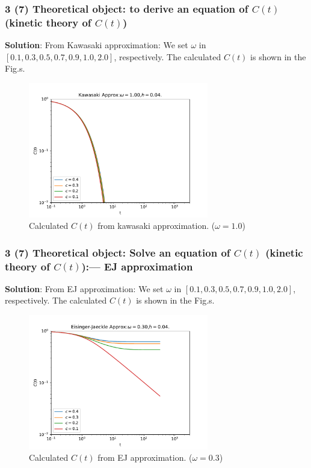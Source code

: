 \documentclass[8pt]{beamer}
\begin{document}
\begin{frame}
	\frametitle{3 (7) Theoretical object: to derive an equation of $C(t)$ (kinetic theory of $C(t)$)}
	
	{\textbf{Solution}}: From
	Kawasaki approximation:
	We set $\omega$ in  $[0.1,0.3,0.5,0.7,0.9,1.0,2.0]$, respectively.  The calculated $C(t)$ is shown in the Fig.s.
	\begin{figure}
		\centering
		\includegraphics [width=0.7\textwidth] {../../kawasaki_approx/imag/beta_dependence_of_corr_omega1.00_step13_h0.04_loglog.pdf}
		\setlength{\abovecaptionskip}{0pt}
		\caption{Calculated $C(t)$ from kawasaki approximation. ($\omega = 1.0$) }
	\end{figure}
\end{frame}

\begin{frame}
	\frametitle{3 (7) Theoretical object: Solve an equation of $C(t)$ (kinetic theory of $C(t)$):--- EJ approximation}	
	{\textbf{Solution}}: From
	EJ approximation:
	We set $\omega$ in  $[0.1,0.3,0.5,0.7,0.9,1.0,2.0]$, respectively.  The calculated $C(t)$ is shown in the Fig.s.
	\begin{figure}
		\centering
		\includegraphics [width=0.7\textwidth] {../../EJ_approx/imag/beta_dependence_of_corr_omega0.30_step13_h0.04_loglog.pdf}
		\setlength{\abovecaptionskip}{0pt}
		\caption{Calculated $C(t)$ from EJ approximation. ($\omega = 0.3$) }
	\end{figure}
\end{frame}
\end{document}
